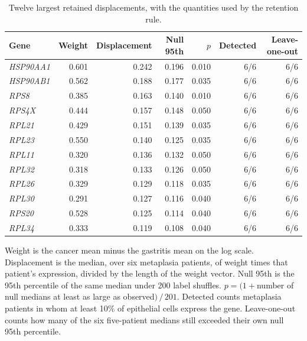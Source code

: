 \documentclass[11pt,a4paper]{article}
\begin{document}
\begin{table}[htbp]
  \centering
  \caption{Twelve largest retained displacements, with the quantities used by the retention rule.}
  \label{tab:top}
  \footnotesize
  \setlength{\tabcolsep}{3.5pt}
  \begin{tabular}{lrrrrrr}
    \toprule
    Gene & Weight & Displacement & Null 95th & \(p\) & Detected & Leave-one-out \\
    \midrule
    \textit{HSP90AA1} & 0.601 & 0.242 & 0.196 & 0.010 & 6/6 & 6/6 \\
    \textit{HSP90AB1} & 0.562 & 0.188 & 0.177 & 0.035 & 6/6 & 6/6 \\
    \textit{RPS8} & 0.385 & 0.163 & 0.140 & 0.010 & 6/6 & 6/6 \\
    \textit{RPS4X} & 0.444 & 0.157 & 0.148 & 0.050 & 6/6 & 6/6 \\
    \textit{RPL21} & 0.429 & 0.151 & 0.139 & 0.035 & 6/6 & 6/6 \\
    \textit{RPL23} & 0.550 & 0.140 & 0.125 & 0.035 & 6/6 & 6/6 \\
    \textit{RPL11} & 0.320 & 0.136 & 0.132 & 0.050 & 6/6 & 6/6 \\
    \textit{RPL32} & 0.318 & 0.133 & 0.126 & 0.050 & 6/6 & 6/6 \\
    \textit{RPL26} & 0.329 & 0.129 & 0.118 & 0.035 & 6/6 & 6/6 \\
    \textit{RPL30} & 0.291 & 0.127 & 0.116 & 0.040 & 6/6 & 6/6 \\
    \textit{RPS20} & 0.528 & 0.125 & 0.114 & 0.040 & 6/6 & 6/6 \\
    \textit{RPL34} & 0.333 & 0.119 & 0.108 & 0.040 & 6/6 & 6/6 \\
    \bottomrule
  \end{tabular}
  \par\vspace{0.35em}
  {\raggedright\footnotesize Weight is the cancer mean minus the gastritis mean on the log scale. Displacement is the median, over six metaplasia patients, of weight times that patient's expression, divided by the length of the weight vector. Null 95th is the 95th percentile of the same median under 200 label shuffles. \(p=(1+\)number of null medians at least as large as observed\()\,/\,201\). Detected counts metaplasia patients in whom at least 10\% of epithelial cells express the gene. Leave-one-out counts how many of the six five-patient medians still exceeded their own null 95th percentile.\par}
\end{table}
\end{document}
